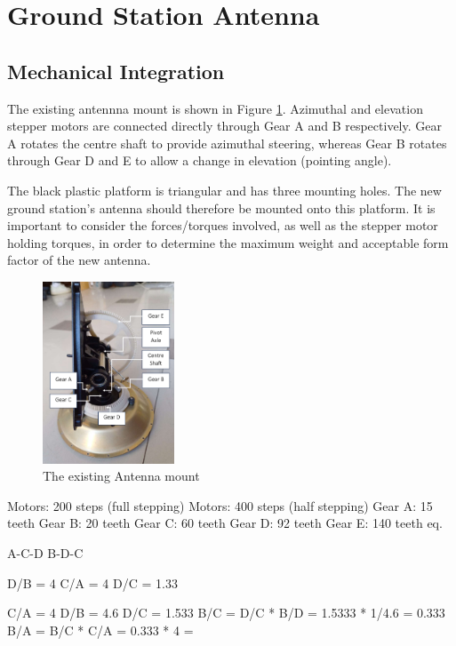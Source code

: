 \graphicspath{{./figures}}

\section{Ground Station Antenna}
\subsection{Mechanical Integration}

The existing antennna mount is shown in Figure \ref{fig:antennaMount}. Azimuthal and elevation stepper motors are connected directly through Gear A and B respectively. Gear A rotates the centre shaft to provide azimuthal steering, whereas Gear B rotates through Gear D and E to allow a change in elevation (pointing angle).

The black plastic platform is triangular and has three mounting holes. The new ground station's antenna should therefore be mounted onto this platform. It is important to consider the forces/torques involved, as well as the stepper motor holding torques, in order to determine the maximum weight and acceptable form factor of the new antenna.

\begin{figure}[!htb]
  \centering
  \includegraphics[width=0.35\textwidth]{antennaMount}
  \caption{The existing Antenna mount}
  \label{fig:antennaMount}
\end{figure}

Motors: 200 steps (full stepping)
Motors: 400 steps (half stepping)
Gear A: 15 teeth
Gear B: 20 teeth
Gear C: 60 teeth
Gear D: 92 teeth
Gear E: 140 teeth eq.

A-C-D
B-D-C

D/B = 4
C/A = 4
D/C = 1.33

C/A = 4
D/B = 4.6
D/C = 1.533
B/C = D/C * B/D =  1.5333 * 1/4.6 = 0.333
B/A = B/C * C/A = 0.333 * 4 = 





